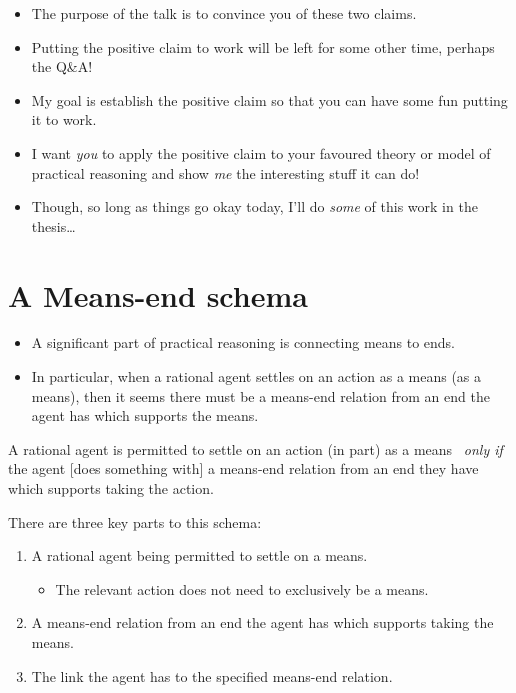 \documentclass[10pt]{article}
\newenvironment{beamerblock}[1]{%
  \tcolorbox[standard,%
  no shadow,
  noparskip,
  colback=white,
  colframe=black,
  colbacktitle=white,
  coltitle=black,
  colupper=black,
  size=small,
  boxrule=.125mm,
  fonttitle=\bfseries,
  sharp corners=all,
  title=#1]}%
{\endtcolorbox}
\newcommand{\hozlinedash}[0]{%
  \noindent\hdashrule[0.5ex][c]{\textwidth}{.1pt}{2.5pt}
}
\begin{document}
\hozlinedash

\begin{itemize}[noitemsep]
\item The purpose of the talk is to convince you of these two claims.
\item Putting the positive claim to work will be left for some other time, perhaps the Q\&A!
\item My goal is establish the positive claim so that you can have some fun putting it to work.
\item I want \emph{you} to apply the positive claim to your favoured theory or model of practical reasoning and show \emph{me} the interesting stuff it can do!
\item Though, so long as things go okay today, I'll do \emph{some} of this work in the thesis\dots
\end{itemize}


\newpage

\section{A Means-end schema}
\label{sec:means-end-schema}


\begin{itemize}
\item A significant part of practical reasoning is connecting means to ends.
\item In particular, when a rational agent settles on an action as a means (as a means), then it seems there must be a means-end relation from an end the agent has which supports the means.
\end{itemize}

\begin{beamerblock}{Means-end schema}
  A rational agent is permitted to settle on an action (in part) as a means
  \newline
  \mbox{ }\hfill\emph{only if}\hfill\mbox{ }
  \newline
  the agent [{does something with}] a means-end relation from an end they have which supports taking the action.
\end{beamerblock}

There are three key parts to this schema:
\begin{enumerate}[label=\arabic*., ref=(\arabic*)]
\item A rational agent being permitted to settle on a means.
  \begin{itemize}
  \item The relevant action does not need to exclusively be a means.
  \end{itemize}
\item A means-end relation from an end the agent has which supports taking the means.
\item The link the agent has to the specified means-end relation.
\end{enumerate}
\end{document}
